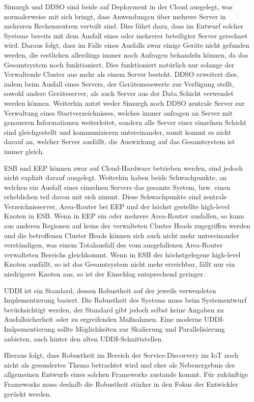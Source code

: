 \documentclass[conference,compsoc]{IEEEtran}
\begin{document}
Simurgh und DDSO sind beide auf Deployment in der Cloud ausgelegt, was normalerweise mit sich bringt, dass Anwendungen über mehrere Server in mehreren Rechenzentren verteilt sind. Dies führt dazu, dass im Entwurf solcher Systeme bereits mit dem Ausfall eines oder mehrerer beteiligter Server gerechnet wird. Daraus folgt, dass im Falle eines Ausfalls zwar einige Geräte nicht gefunden werden, die restlichen allerdings immer noch Anfragen behandeln können, da das Gesamtsystem noch funktioniert. Dies funktioniert natürlich nur solange der Verwaltende Cluster aus mehr als einem Server besteht. DDSO erweitert dies, indem beim Ausfall eines Servers, der Gerätemesswerte zur Verfügung stellt, sowohl andere Geräteserver, als auch Server aus der Data Schicht verwendet werden können. Weiterhin nutzt weder Simurgh noch DDSO zentrale Server zur Verwaltung eines Startverzeichnisses, welches immer anfragen an Server mit genaueren Informationen weiterleitet, sondern alle Server einer einzelnen Schicht sind gleichgestellt und kommunizieren untereinander, somit kommt es nicht darauf an, welcher Server ausfällt, die Auswirkung auf das Gesamtsystem ist immer gleich.

ESB und EEP können zwar auf Cloud-Hardware betrieben werden, sind jedoch nicht explizit darauf ausgelegt. Weiterhin haben beide Schwachpunkte, an welchen ein Ausfall eines einzelnen Servers das gesamte System, bzw. einen erheblichen teil davon mit sich nimmt. Diese Schwachpunkte sind zentrale Verzeichnisserver, Area-Router bei EEP und der höchst gestellte high-level Knoten in ESB. Wenn in EEP ein oder mehrere Area-Router ausfallen, so kann aus anderen Regionen auf keins der verwalteten Cluster Heads zugegriffen werden und die betroffenen Cluster Heads können sich auch nicht mehr untereinander verständigen, was einem Totalausfall des vom ausgefallenen Area-Router verwalteten Bereichs gleichkommt. Wenn in ESB der höchstgelegene high-level Knoten ausfällt, so ist das Gesamtsystem nicht mehr erreichbar, fällt nur ein niedrigerer Knoten aus, so ist der Einschlag entsprechend geringer.

UDDI ist ein Standard, dessen Robustheit auf der jeweils verwendeten Implementierung basiert. Die Robustheit des Systems muss beim Systementwurf berücksichtigt werden, der Standard gibt jedoch selbst keine Angaben zu Ausfallsicherheit oder zu ergreifenden Maßnahmen. Eine moderne UDDI-Imlpementierung sollte Möglichkeiten zur Skalierung und Parallelisierung anbieten, auch hinter den alten UDDI-Schnittstellen.

Hieraus folgt, dass Robustheit im Bereich der Service-Discorvery im IoT noch nicht als gesondertes Thema betrachtet wird und eher als Nebenergebnis des allgemeinen Entwurfs eines solchen Frameworks zustande kommt. Für zukünftige Frameworks muss deshalb die Robustheit stärker in den Fokus der Entwickler gerückt werden.
\end{document}
